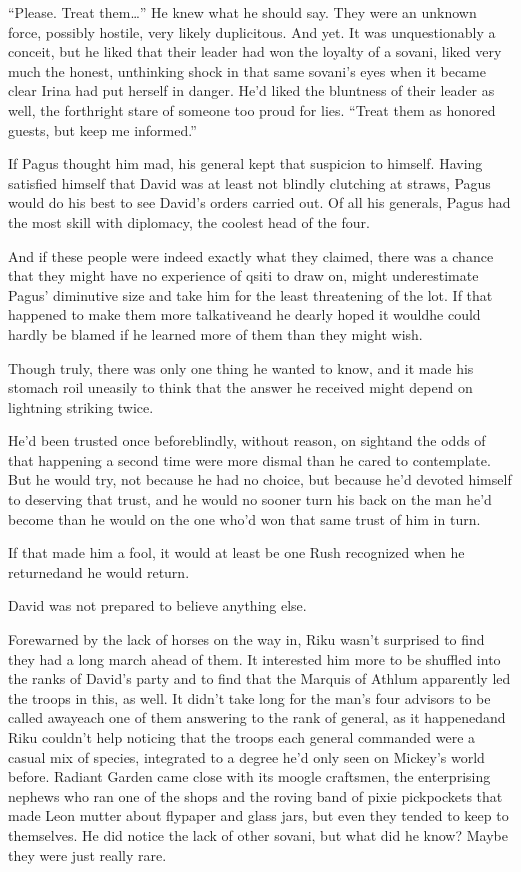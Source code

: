 ``Please. Treat them\ldots '' He knew what he should say. They were an unknown force, possibly hostile, very likely duplicitous. And yet. It was unquestionably a conceit, but he liked that their leader had won the loyalty of a sovani, liked very much the honest, unthinking shock in that same sovani's eyes when it became clear Irina had put herself in danger. He'd liked the bluntness of their leader as well, the forthright stare of someone too proud for lies. ``Treat them as honored guests, but keep me informed.''

If Pagus thought him mad, his general kept that suspicion to himself. Having satisfied himself that David was at least not blindly clutching at straws, Pagus would do his best to see David's orders carried out. Of all his generals, Pagus had the most skill with diplomacy, the coolest head of the four.

And if these people were indeed exactly what they claimed, there was a chance that they might have no experience of qsiti to draw on, might underestimate Pagus' diminutive size and take him for the least threatening of the lot. If that happened to make them more talkative\textemdash and he dearly hoped it would\textemdash he could hardly be blamed if he learned more of them than they might wish.

Though truly, there was only one thing he wanted to know, and it made his stomach roil uneasily to think that the answer he received might depend on lightning striking twice.

He'd been trusted once before\textemdash blindly, without reason, on sight\textemdash and the odds of that happening a second time were more dismal than he cared to contemplate. But he would try, not because he had no choice, but because he'd devoted himself to deserving that trust, and he would no sooner turn his back on the man he'd become than he would on the one who'd won that same trust of him in turn.

If that made him a fool, it would at least be one Rush recognized when he returned\textemdash and he would return.

David was not prepared to believe anything else.


\scenechange


Forewarned by the lack of horses on the way in, Riku wasn't surprised to find they had a long march ahead of them. It interested him more to be shuffled into the ranks of David's party and to find that the Marquis of Athlum apparently led the troops in this, as well. It didn't take long for the man's four advisors to be called away\textemdash each one of them answering to the rank of general, as it happened\textemdash and Riku couldn't help noticing that the troops each general commanded were a casual mix of species, integrated to a degree he'd only seen on Mickey's world before. Radiant Garden came close with its moogle craftsmen, the enterprising nephews who ran one of the shops and the roving band of pixie pickpockets that made Leon mutter about flypaper and glass jars, but even they tended to keep to themselves. He did notice the lack of other sovani, but what did he know? Maybe they were just really rare.

